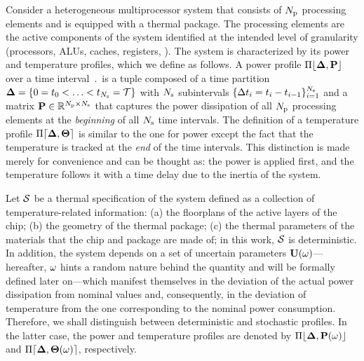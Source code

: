 
Consider a heterogeneous multiprocessor system that consists of ${N_\text{p}}$ processing elements and is equipped with a thermal package. The processing elements are the active components of the system identified at the intended level of granularity (processors, ALUs, caches, registers, \etc). The system is characterized by its power and temperature profiles, which we define as follows. A power profile $\profP$ over a time interval $\period$ is a tuple composed of a time partition $\boldsymbol{\Delta} = \{ 0 = t_0 < \dotsc < t_{N_\text{s}} = \mathcal{T} \}$ with $N_\text{s}$ subintervals $\{ \Delta t_i = t_i - t_{i - 1} \}_{i = 1}^{N_\text{s}}$ and a matrix $\mP \in \real^{\cores \times \steps}$ that captures the power dissipation of all ${N_\text{p}}$ processing elements at the \emph{beginning} of all $N_\text{s}$ time intervals. The definition of a temperature profile $\profT$ is similar to the one for power except the fact that the temperature is tracked at the \emph{end} of the time intervals. This distinction is made merely for convenience and can be thought as: the power is applied first, and the temperature follows it with a time delay due to the inertia of the system.

Let $\mathcal{S}$ be a thermal specification of the system defined as a collection of temperature-related information: (a) the floorplans of the active layers of the chip; (b) the geometry of the thermal package; (c) the thermal parameters of the materials that the chip and package are made of; in this work, $\mathcal{S}$ is deterministic. In addition, the system depends on a set of uncertain parameters $\mathbf{U}(\omega)$---hereafter, $\omega$ hints a random nature behind the quantity and will be formally defined later on---which manifest themselves in the deviation of the actual power dissipation from nominal values and, consequently, in the deviation of temperature from the one corresponding to the nominal power consumption. Therefore, we shall distinguish between deterministic and stochastic profiles. In the latter case, the power and temperature profiles are denoted by $\profP{\o}$ and $\profT{\o}$, respectively.

